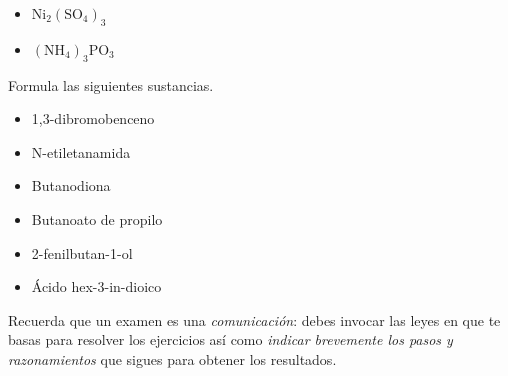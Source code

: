 \documentclass[a4paper,addpoints,14pt]{exam}
\newcommand*\chem[1]{\ensuremath{\mathrm{#1}}}
\begin{document}
\begin{questions}
\begin{question}[4]
\begin{itemize}
		
		\item $\chem{Ni_2(SO_4)_3}$\vspace{50pt}
		
		\item $\chem{(NH_4)_3PO_3}$\vspace{50pt}
		
	
	\end{itemize}
\end{question}



\begin{question}[4] Formula las siguientes sustancias. 

		\begin{itemize}
		\item 1,3-dibromobenceno\vspace{50pt}
		
		\item N-etiletanamida\vspace{50pt}
		
		\item Butanodiona\vspace{50pt}
		
		\item Butanoato de propilo\vspace{50pt}
		
		\item 2-fenilbutan-1-ol\vspace{50pt}
				
		\item  Ácido hex-3-in-dioico\vspace{50pt}
		
		
		
	\end{itemize}
\end{question}


	
\begin{problemas}{Recuerda que un examen es una \textit{comunicación}: debes invocar las leyes en que te basas para resolver los ejercicios así como \textit{indicar brevemente los pasos y razonamientos} que sigues para obtener los resultados.}
\end{problemas}
\vspace{5ex}


\end{questions}
\end{document}
